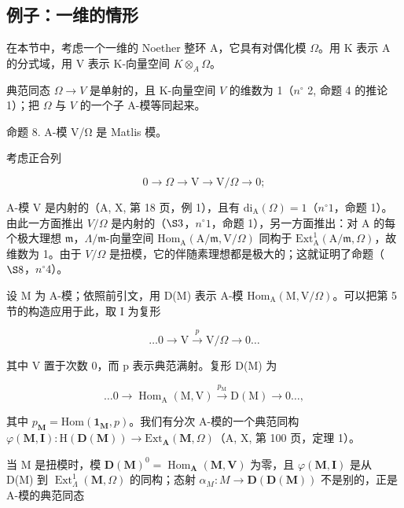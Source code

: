 \subsection{例子：一维的情形}

在本节中，考虑一个一维的 Noether 整环 A，它具有对偶化模 \(\Omega\)。用 K 表示 A 的分式域，用 V 表示 K-向量空间 \(K \otimes_{A} \Omega\)。

典范同态 \(\Omega\to V\) 是单射的，且 K-向量空间 \(V\) 的维数为 1（\(n^{\circ}\) 2, 命题 4 的推论 1）；把 \(\Omega\) 与 \(V\) 的一个子 A-模等同起来。

命题 8. A-模 V/Ω 是 Matlis 模。

考虑正合列

\[
0 \to \Omega \to \mathrm{V} \to \mathrm{V} / \Omega \to 0;
\]

A-模 V 是内射的（A, X, 第 18 页，例 1），且有 \(\mathrm{di}_{\mathrm{A}}(\Omega) = 1\)（\(n^{\circ} 1\)，命题 1）。由此一方面推出 \(V/\Omega\) 是内射的（\(\S 3\)，\(n^{\circ} 1\)，命题 1），另一方面推出：对 A 的每个极大理想 \(\mathfrak{m}\)，\(\Lambda/\mathfrak{m}\)-向量空间 \(\mathrm{Hom}_{\mathrm{A}}(\mathrm{A}/\mathfrak{m}, \mathrm{V}/\Omega)\) 同构于 \(\mathrm{Ext}_{\mathrm{A}}^{1}(\mathrm{A}/\mathfrak{m}, \Omega)\)，故维数为 1。由于 \(V/\Omega\) 是扭模，它的伴随素理想都是极大的；这就证明了命题（\(\S 8\)，\(n^{\circ} 4\)）。

设 M 为 A-模；依照前引文，用 D(M) 表示 A-模 \(\mathrm{Hom}_{\mathrm{A}}(\mathrm{M},\mathrm{V}/\Omega)\)。可以把第 5 节的构造应用于此，取 I 为复形

\[
\dots 0 \longrightarrow \mathrm{V} \xrightarrow {p} \mathrm{V} / \Omega \longrightarrow 0 \dots
\]

其中 V 置于次数 0，而 p 表示典范满射。复形 D(M) 为

\[
\dots 0 \longrightarrow \operatorname{Hom} _ {\mathrm{A}} (\mathrm{M}, \mathrm{V}) \xrightarrow {p _ {\mathrm{M}}} \mathrm{D} (\mathrm{M}) \longrightarrow 0 \dots ,
\]

其中 \(p_{\mathbf{M}} = \mathrm{Hom}(\mathbf{1}_{\mathbf{M}}, p)\)。我们有分次 A-模的一个典范同构 \(\varphi(\mathbf{M}, \mathbf{I}) : \mathrm{H}(\mathbf{D}(\mathbf{M})) \longrightarrow \mathrm{Ext}_{\mathbf{A}}(\mathbf{M}, \Omega)\)（A, X, 第 100 页，定理 1）。

当 M 是扭模时，模 \(\mathbf{D}(\mathbf{M})^{0} = \operatorname{Hom}_{\mathbf{A}}(\mathbf{M}, \mathbf{V})\) 为零，且 \(\varphi(\mathbf{M}, \mathbf{I})\) 是从 D(M) 到 \(\operatorname{Ext}_{\Lambda}^{1}(\mathbf{M}, \Omega)\) 的同构；态射 \(\alpha_{M}: M \to \mathbf{D}(\mathbf{D}(\mathbf{M}))\) 不是别的，正是 A-模的典范同态

